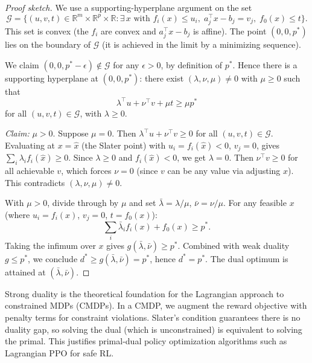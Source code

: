 \documentclass[11pt,a4paper]{article}
\theoremstyle{definition}
\theoremstyle{plain}
\theoremstyle{remark}
\newcommand{\R}{\mathbb{R}}
\begin{document}
\begin{proof}[Proof sketch]
We use a supporting-hyperplane argument on the set
\[
  \mathcal{G} = \{(u, v, t) \in \R^m \times \R^p \times \R :
    \exists\, x \text{ with } f_i(x) \le u_i,\; a_j^\top x - b_j = v_j,\;
    f_0(x) \le t\}.
\]
This set is convex (the $f_i$ are convex and $a_j^\top x - b_j$ is affine).
The point $(0, 0, p^*)$ lies on the boundary of $\mathcal{G}$ (it is achieved
in the limit by a minimizing sequence).

We claim $(0, 0, p^*-\epsilon) \notin \mathcal{G}$ for any $\epsilon > 0$, by
definition of $p^*$. Hence there is a supporting hyperplane at $(0, 0, p^*)$:
there exist $(\lambda, \nu, \mu) \ne 0$ with $\mu \ge 0$ such that
\[
  \lambda^\top u + \nu^\top v + \mu t \ge \mu p^*
\]
for all $(u, v, t) \in \mathcal{G}$, with $\lambda \ge 0$.

\emph{Claim:} $\mu > 0$. Suppose $\mu = 0$. Then
$\lambda^\top u + \nu^\top v \ge 0$ for all $(u,v,t) \in \mathcal{G}$.
Evaluating at $x = \hat{x}$ (the Slater point) with $u_i = f_i(\hat{x}) < 0$,
$v_j = 0$, gives $\sum_i \lambda_i f_i(\hat{x}) \ge 0$. Since $\lambda \ge 0$
and $f_i(\hat{x}) < 0$, we get $\lambda = 0$. Then $\nu^\top v \ge 0$ for all
achievable $v$, which forces $\nu = 0$ (since $v$ can be any value via
adjusting $x$). This contradicts $(\lambda, \nu, \mu) \ne 0$.

With $\mu > 0$, divide through by $\mu$ and set $\bar{\lambda} = \lambda/\mu$,
$\bar{\nu} = \nu/\mu$. For any feasible $x$ (where $u_i = f_i(x)$, $v_j = 0$,
$t = f_0(x)$):
\[
  \sum_i \bar{\lambda}_i f_i(x) + f_0(x) \ge p^*.
\]
Taking the infimum over $x$ gives
$g(\bar{\lambda}, \bar{\nu}) \ge p^*$. Combined with weak duality $g \le p^*$,
we conclude $d^* \ge g(\bar{\lambda}, \bar{\nu}) = p^*$, hence $d^* = p^*$.
The dual optimum is attained at $(\bar{\lambda}, \bar{\nu})$.
\end{proof}

\begin{rlconnection}
Strong duality is the theoretical foundation for the Lagrangian approach to
constrained MDPs (CMDPs). In a CMDP, we augment the reward objective with
penalty terms for constraint violations. Slater's condition guarantees there is
no duality gap, so solving the dual (which is unconstrained) is equivalent to
solving the primal. This justifies primal-dual policy optimization algorithms
such as Lagrangian PPO for safe RL.
\end{rlconnection}

\end{document}
